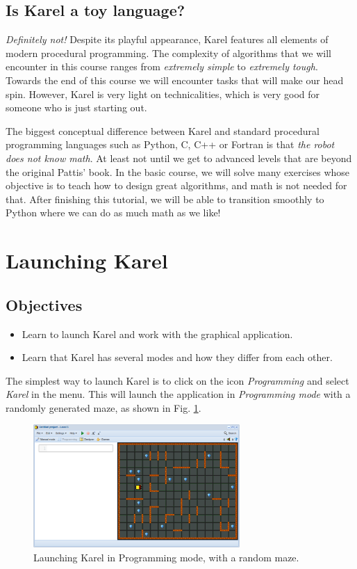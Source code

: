 \documentclass[article,A4,12pt]{llncs}
\begin{document}
\subsection{Is Karel a toy language?}

{\em Definitely not!} Despite its playful appearance, Karel features all elements 
of modern procedural programming. The complexity of algorithms 
that we will encounter in this course ranges from {\em extremely simple} 
to {\em extremely tough}. Towards the end of this course we will encounter 
tasks that will make our head spin. However, Karel is very light on 
technicalities, which is very good for someone who is just starting out.

The biggest conceptual difference between Karel and standard procedural
programming languages such as Python, C, C++ or Fortran is that {\em the robot does not 
know math}. At least not until we get to advanced levels that are beyond 
the original Pattis' book. In the basic course, we will solve many exercises 
whose objective is to teach how to design great algorithms, and math is 
not needed for that. After finishing this tutorial, we will be able to transition 
smoothly to Python where we can do as much math as we like!
 
\section{Launching Karel}

\subsection{Objectives} 
\begin{itemize}
\item Learn to launch Karel and work with the graphical application.
\item Learn that Karel has several modes and how they differ from each other.
\end{itemize}
\noindent
The simplest way to launch Karel is to click on the icon 
{\em Programming} and select {\em Karel} in the menu. This will launch the application 
in {\em Programming mode} with a randomly generated maze, as shown in Fig. \ref{fig:init}.

\begin{figure}[!ht]
\begin{center}
\includegraphics[width=0.7\textwidth]{img/init.png}
\end{center}
\vspace{-2mm}
\caption{Launching Karel in Programming mode, with a random maze.}
\label{fig:init}
\end{figure}
\end{document}
